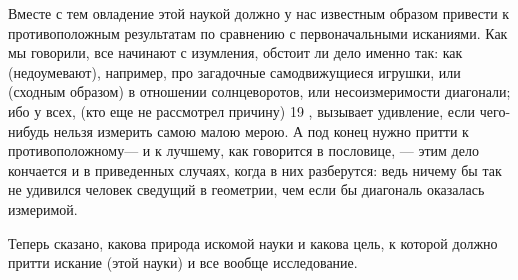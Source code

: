 \documentclass{article}
\begin{document}
Вместе с тем овладение этой наукой должно у нас известным образом привести к противоположным результатам по сравнению с первоначальными исканиями. Как мы говорили, все начинают с изумления, обстоит ли дело именно так: как (недоумевают), например, про загадочные самодвижущиеся игрушки, или (сходным образом) в отношении солнцеворотов, или несоизмеримости диагонали; ибо у всех, (кто еще не рассмотрел причину)  19 , вызывает удивление, если чего-нибудь нельзя измерить самою малою мерою. А под конец нужно притти к противоположному— и к лучшему, как говорится в пословице, — этим дело кончается и в приведенных случаях, когда в них разберутся: ведь ничему бы так не удивился человек сведущий в геометрии, чем если бы диагональ оказалась измеримой.

Теперь сказано, какова природа искомой науки и какова цель, к которой должно притти искание (этой науки) и все вообще исследование.
\end{document}
